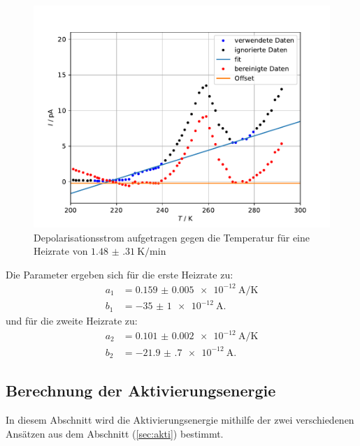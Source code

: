 \begin{figure}[h!]
  \centering
  \includegraphics[scale=0.8]{fig/plot2.pdf}
  \caption{Depolarisationsstrom aufgetragen gegen die Temperatur für eine Heizrate von $\SI{1.48(31)}{\kelvin\per\minute}$}
  \label{fig:2}
\end{figure}
\FloatBarrier
Die Parameter ergeben sich für die erste Heizrate zu:
\begin{align*}
    a_\mathrm{1} &= \SI{0.159(5)e-12}{\ampere\per\kelvin} \\
    b_\mathrm{1} &= \SI{-35(1)e-12}{\ampere}.
\end{align*}
und für die zweite Heizrate zu:
\begin{align*}
    a_\mathrm{2} &= \SI{0.101(2)e-12}{\ampere\per\kelvin} \\
    b_\mathrm{2} &= \SI{-21.9(7)e-12}{\ampere}.
\end{align*}
\subsection{Berechnung der Aktivierungsenergie}
In diesem Abschnitt wird die Aktivierungsenergie mithilfe der zwei verschiedenen Ansätzen aus dem Abschnitt (\ref{sec:akti}) bestimmt.
